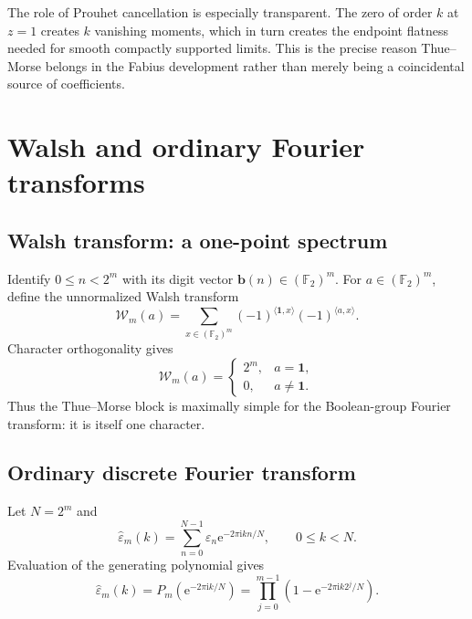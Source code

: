 \documentclass[11pt,oneside]{article}
\theoremstyle{definition}
\theoremstyle{remark}
\newcommand{\Ftwo}{\mathbb F_2}
\newcommand{\e}{\mathrm e}
\newcommand{\ii}{\mathrm i}
\newcommand{\eps}{\varepsilon}
\begin{document}
The role of Prouhet cancellation is especially transparent.  The zero of order
$k$ at $z=1$ creates $k$ vanishing moments, which in turn creates the endpoint
flatness needed for smooth compactly supported limits.  This is the precise
reason Thue--Morse belongs in the Fabius development rather than merely being a
coincidental source of coefficients.

\section{Walsh and ordinary Fourier transforms}

\subsection{Walsh transform: a one-point spectrum}

Identify $0\le n<2^m$ with its digit vector
$\mathbf b(n)\in(\Ftwo)^m$.  For $a\in(\Ftwo)^m$, define the unnormalized
Walsh transform
\begin{equation}\label{eq:walsh-transform-def}
 \mathcal W_m(a)=\sum_{x\in(\Ftwo)^m}
  (-1)^{\langle\mathbf1,x\rangle}(-1)^{\langle a,x\rangle}.
\end{equation}
Character orthogonality gives
\begin{equation}\label{eq:walsh-one-point}
 \boxed{\qquad
 \mathcal W_m(a)=
 \begin{cases}
 2^m,&a=\mathbf1,\\
 0,&a\ne\mathbf1.
 \end{cases}
 \qquad}
\end{equation}
Thus the Thue--Morse block is maximally simple for the Boolean-group Fourier
transform: it is itself one character.

\subsection{Ordinary discrete Fourier transform}

Let $N=2^m$ and
\begin{equation}\label{eq:dft-def}
 \widehat\eps_m(k)=\sum_{n=0}^{N-1}\eps_n
  \e^{-2\pi\ii kn/N},
 \qquad 0\le k<N.
\end{equation}
Evaluation of the generating polynomial gives
\begin{equation}\label{eq:dft-product}
 \boxed{\qquad
 \widehat\eps_m(k)=P_m\!\left(\e^{-2\pi\ii k/N}\right)
 =\prod_{j=0}^{m-1}
  \left(1-\e^{-2\pi\ii k2^j/N}\right).
 \qquad}
\end{equation}
\end{document}
